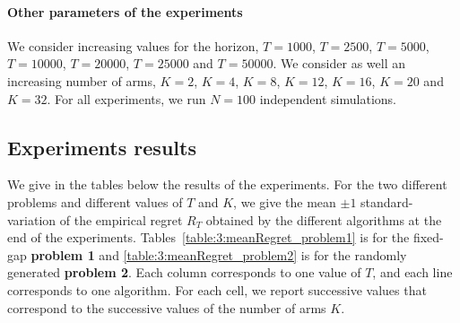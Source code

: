 \paragraph{Other parameters of the experiments}

We consider increasing values for the horizon, $T=1000$, $T=2500$, $T=5000$, $T=10000$, $T=20000$, $T=25000$ and $T=50000$.
We consider as well an increasing number of arms, $K=2$, $K=4$, $K=8$, $K=12$, $K=16$, $K=20$ and $K=32$.
For all experiments, we run $N=100$ independent simulations.


\subsection{Experiments results}

We give in the tables below the results of the experiments. For the two different problems and different values of $T$ and $K$, we give the mean $\pm 1$ standard-variation of the empirical regret $R_T$ obtained by the different algorithms at the end of the experiments.
Tables~\ref{table:3:meanRegret_problem1} is for the fixed-gap \textbf{problem 1}
and \ref{table:3:meanRegret_problem2} is for the randomly generated \textbf{problem 2}.
Each column corresponds to one value of $T$, and each line corresponds to one algorithm.
For each cell, we report successive values that correspond to the successive values of the number of arms $K$.




